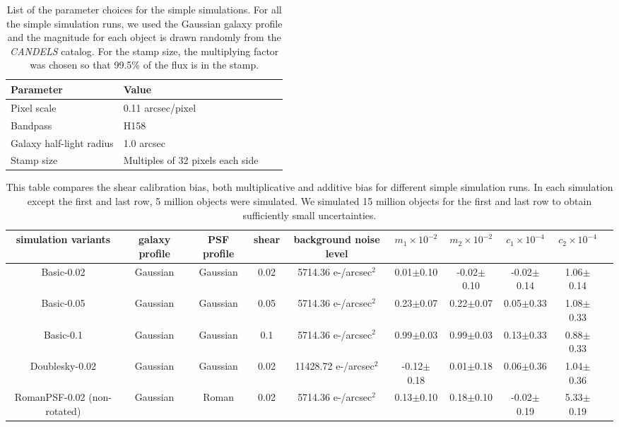\documentclass[fleqn,usenatbib]{mnras}
\begin{document}
\begin{table}
    \centering
    \begin{tabular}[width=\columnwidth]{|p{3cm}||p{3cm}|p{3cm}|p{3cm}|}
    \hline
    Parameter & Value \\
    \hline
    Pixel scale & 0.11 arcsec/pixel\\
    Bandpass & H158 \\
    Galaxy half-light radius & 1.0 arcsec\\
    Stamp size & Multiples of 32 pixels each side\\
    \hline
    \end{tabular}
    \caption{List of the parameter choices for the simple simulations. For all the simple simulation runs, we used the Gaussian galaxy profile and the magnitude for each object is drawn randomly from the \emph{CANDELS} catalog. For the stamp size, the multiplying factor was chosen so that 99.5\% of the flux is in the stamp.}
    \label{tab:params}
\end{table}

\begin{table}
	\centering
	\begin{tabular}[width=\textwidth]{ c|c|c|c|c|c|c|c|c|c } 
		\hline
		simulation variants & galaxy profile & PSF profile & shear & background noise level & $m_{1}\times10^{-2}$ & $m_{2}\times10^{-2}$ & $c_{1}\times10^{-4}$ & $c_{2}\times10^{-4}$\\
		\hline
		Basic-0.02 & Gaussian & Gaussian & 0.02 & 5714.36 e-/arcsec$^2$ & 0.01$\pm$0.10 & -0.02$\pm$0.10 & -0.02$\pm$0.14 & 1.06$\pm$0.14\\
		Basic-0.05 & Gaussian & Gaussian & 0.05 & 5714.36 e-/arcsec$^2$ & 0.23$\pm$0.07 & 0.22$\pm$0.07 & 0.05$\pm$0.33 & 1.08$\pm$0.33\\
		Basic-0.1 & Gaussian & Gaussian & 0.1 & 5714.36 e-/arcsec$^2$ & 0.99$\pm$0.03 & 0.99$\pm$0.03 & 0.13$\pm$0.33 & 0.88$\pm$0.33\\
		\hline
		Doublesky-0.02 & Gaussian & Gaussian & 0.02 & 11428.72 e-/arcsec$^2$ & -0.12$\pm$0.18 & 0.01$\pm$0.18 & 0.06$\pm$0.36 & 1.04$\pm$0.36\\
		\hline
		RomanPSF-0.02 (non-rotated) & Gaussian & Roman & 0.02 & 5714.36 e-/arcsec$^2$ & 0.13$\pm$0.10 & 0.18$\pm$0.10 & -0.02$\pm$0.19 & 5.33$\pm$0.19\\
		\hline
	\end{tabular}
	\caption{This table compares the shear calibration bias, both multiplicative and additive bias for different simple simulation runs. In each simulation except the first and last row, 5 million objects were simulated. We simulated 15 million objects for the first and last row to obtain sufficiently small uncertainties.}
	\label{tab:simple_sim_result}
\end{table}
\end{document}

